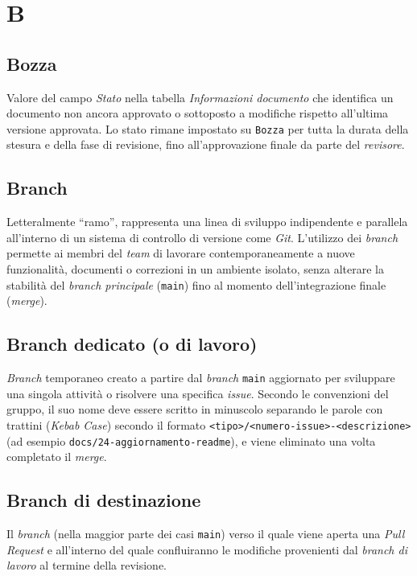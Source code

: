 \documentclass[11pt, a4paper]{article}
\begin{document}
\newpage

\section*{B}

\subsection*{Bozza}
Valore del campo \textit{Stato} nella tabella \textit{Informazioni documento} che identifica un documento non ancora approvato o sottoposto a modifiche rispetto all'ultima versione approvata. Lo stato rimane impostato su \texttt{Bozza} per tutta la durata della stesura e della fase di revisione, fino all'approvazione finale da parte del \textit{revisore}.

\subsection*{Branch}
Letteralmente ``ramo'', rappresenta una linea di sviluppo indipendente e parallela all'interno di un sistema di controllo di versione come \textit{Git}. L'utilizzo dei \textit{branch} permette ai membri del \textit{team} di lavorare contemporaneamente a nuove funzionalità, documenti o correzioni in un ambiente isolato, senza alterare la stabilità del \textit{branch principale} (\texttt{main}) fino al momento dell'integrazione finale (\textit{merge}).

\subsection*{Branch dedicato (o di lavoro)}
\textit{Branch} temporaneo creato a partire dal \textit{branch} \texttt{main} aggiornato per sviluppare una singola attività o risolvere una specifica \textit{issue}. Secondo le convenzioni del gruppo, il suo nome deve essere scritto in minuscolo separando le parole con trattini (\textit{Kebab Case}) secondo il formato \texttt{<tipo>/<numero-issue>-<descrizione>} (ad esempio \texttt{docs/24-aggiornamento-readme}), e viene eliminato una volta completato il \textit{merge}.

\subsection*{Branch di destinazione}
Il \textit{branch} (nella maggior parte dei casi \texttt{main}) verso il quale viene aperta una \textit{Pull Request} e all'interno del quale confluiranno le modifiche provenienti dal \textit{branch di lavoro} al termine della revisione.
\end{document}
